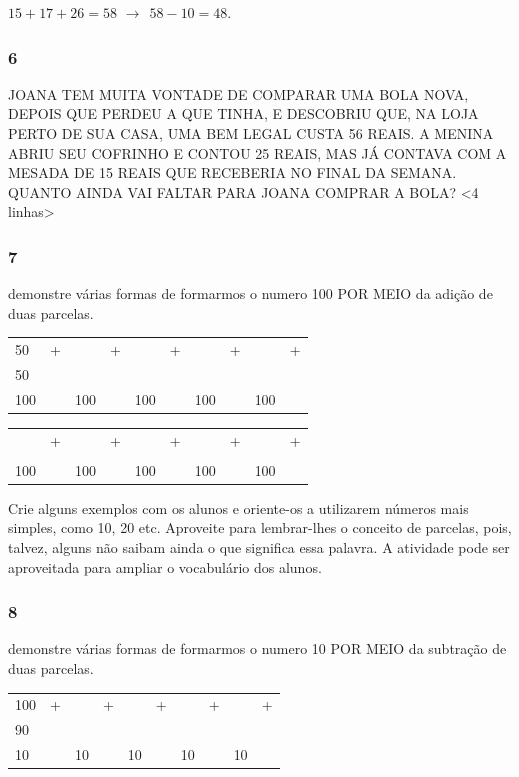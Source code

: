 \(15 + 17 + 26 = 58\) \(\rightarrow \ \ 58 - 10 = 48\).

\subsubsection{6}\label{section-13}

JOANA TEM MUITA VONTADE DE COMPARAR UMA BOLA NOVA, DEPOIS QUE PERDEU A QUE TINHA, E DESCOBRIU QUE, NA LOJA PERTO DE SUA CASA, UMA BEM LEGAL CUSTA 56 REAIS. A MENINA ABRIU SEU COFRINHO E CONTOU 25 REAIS, MAS JÁ CONTAVA COM A MESADA DE 15 REAIS QUE RECEBERIA NO FINAL DA SEMANA. QUANTO AINDA VAI FALTAR PARA JOANA COMPRAR A BOLA?
\textless{}4 linhas\textgreater{}


\subsubsection{7}\label{section-14}

demonstre várias formas de formarmos o numero 100 POR MEIO da adição de
duas parcelas.

\begin{longtable}[]{@{}llllllllll@{}}
\toprule
50 & + & & + & & + & & + & & +\tabularnewline
50 & & & & & & & & &\tabularnewline
100 & & 100 & & 100 & & 100 & & 100 &\tabularnewline
\bottomrule
\end{longtable}

\begin{longtable}[]{@{}llllllllll@{}}
\toprule
& + & & + & & + & & + & & +\tabularnewline
& & & & & & & & &\tabularnewline
100 & & 100 & & 100 & & 100 & & 100 &\tabularnewline
\bottomrule
\end{longtable}

Crie alguns
exemplos com os alunos e oriente-os a utilizarem números mais simples,
como 10, 20 etc. Aproveite para lembrar-lhes o conceito de parcelas,
pois, talvez, alguns não saibam ainda o que significa essa palavra.
A atividade pode ser aproveitada para ampliar o vocabulário dos alunos.

\subsubsection{8}\label{section-15}

demonstre várias formas de formarmos o numero 10 POR MEIO da subtração de
duas parcelas.

\begin{longtable}[]{@{}llllllllll@{}}
\toprule
100 & + & & + & & + & & + & & +\tabularnewline
90 & & & & & & & & &\tabularnewline
10 & & 10 & & 10 & & 10 & & 10 &\tabularnewline
\bottomrule
\end{longtable}

